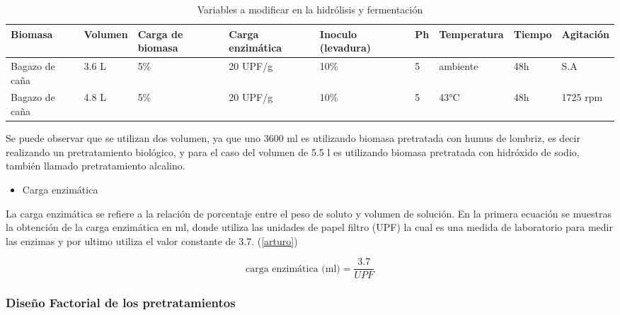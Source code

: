 \documentclass[12pt]{article}
\begin{document}
		
		\begin{table} [h!]
			\centering
			\caption{Variables a modificar en la hidrólisis y fermentación}
			\label{tab:Variables a modificar para la hidrolisis y fermentacion}
			\small
			\begin{tabular}{|p{1.3cm}|p{1.5cm}|p{1.15cm}|p{1.5cm}|p{1.5cm}|p{.5cm}|p{2 cm}|p{1.2cm}|p{1.5cm}|}
				\hline
				Biomasa  & Volumen  & Carga de biomasa  & Carga enzimática  & Inoculo (levadura)  & Ph  & Temperatura  & Tiempo & Agitación  \\
				
				\hline
				Bagazo de caña   & 3.6 L & 5\% & 20 UPF/g  & 10\%  & 5 & ambiente & 48h   & S.A\\

				
				\hline
				Bagazo de caña  & 4.8 L  & 5\%  & 20 UPF/g  & 10\%  & 5 & 43°C & 48h     & 1725 rpm\\

				
				\hline
			\end{tabular}
		
		\end{table}
		
		Se puede observar que se utilizan dos volumen, ya que uno 3600 ml es utilizando biomasa pretratada con humus de lombriz, es decir realizando un pretratamiento biológico, y para el caso del volumen de 5.5 l es utilizando biomasa pretratada con hidróxido de sodio, también llamado pretratamiento alcalino.
		
		
			\begin{itemize}
			\item  Carga enzimática
	     	\end{itemize}
		
		
	La carga enzimática se refiere a la relación de porcentaje entre el peso de soluto y volumen de solución. En la primera ecuación se muestras la obtención de la carga enzimática en ml, donde utiliza las unidades de papel filtro (UPF) la cual es una medida de laboratorio para medir las enzimas y por ultimo utiliza el valor constante de 3.7. (\ref{arturo})
			
	\begin{equation}
		\text{carga enzimática (ml)} = \frac{3.7}{UPF}
	\end{equation}
	
	
	
	

			
		
		
		
		
		
		\subsubsection{Diseño Factorial de los pretratamientos}
		\label{diseño factorial}	
		
\end{document}
